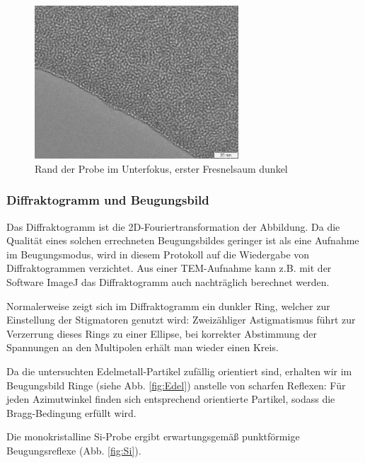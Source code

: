 \begin{figure}[p]
	\centering
	\includegraphics[width=0.68\textwidth]{data/Im_2.jpg}
	\vspace{-1.5ex}
	\caption{Rand der Probe im Unterfokus, erster Fresnelsaum dunkel}	\label{fig:Ueber}
	\vspace{-9em}
\end{figure}

\subsubsection{Diffraktogramm und Beugungsbild}
Das Diffraktogramm ist die 2D-Fouriertransformation der Abbildung. Da die Qualität eines solchen errechneten Beugungsbildes geringer ist als eine Aufnahme im Beugungsmodus, wird in diesem Protokoll auf die Wiedergabe von Diffraktogrammen verzichtet. Aus einer TEM-Aufnahme kann z.B. mit der Software ImageJ \cite{lit:ImageJ} das Diffraktogramm auch nachträglich berechnet werden.


Normalerweise zeigt sich im Diffraktogramm ein dunkler Ring, welcher zur Einstellung der Stigmatoren genutzt wird: Zweizähliger Astigmatismus führt zur Verzerrung dieses Rings zu einer Ellipse, bei korrekter Abstimmung der Spannungen an den Multipolen erhält man wieder einen Kreis.

Da die untersuchten Edelmetall-Partikel zufällig orientiert sind, erhalten wir im Beugungsbild Ringe (siehe Abb. \ref{fig:Edel}) anstelle von scharfen Reflexen: Für jeden Azimutwinkel finden sich entsprechend orientierte Partikel, sodass die Bragg-Bedingung erfüllt wird.

Die monokristalline \textsf{Si}-Probe ergibt erwartungsgemäß punktförmige Beugungsreflexe (Abb. \ref{fig:Si}).

